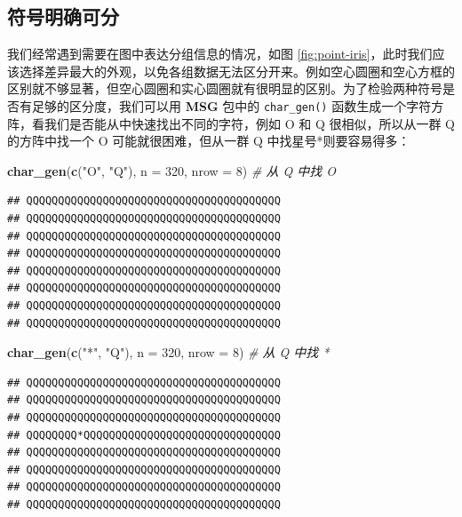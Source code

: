 \documentclass[
  b5paper,
  UTF8,twoside]{book}
\newenvironment{Shaded}{\begin{snugshade}}{\end{snugshade}}
\newcommand{\AttributeTok}[1]{\textcolor[rgb]{0.13,0.29,0.53}{#1}}
\newcommand{\CommentTok}[1]{\textcolor[rgb]{0.56,0.35,0.01}{\textit{#1}}}
\newcommand{\DecValTok}[1]{\textcolor[rgb]{0.00,0.00,0.81}{#1}}
\newcommand{\FunctionTok}[1]{\textcolor[rgb]{0.13,0.29,0.53}{\textbf{#1}}}
\newcommand{\NormalTok}[1]{#1}
\newcommand{\StringTok}[1]{\textcolor[rgb]{0.31,0.60,0.02}{#1}}
\begin{document}
\subsection{符号明确可分}\label{subsec:clear-symbols}

我们经常遇到需要在图中表达分组信息的情况，如图 \ref{fig:point-iris}，此时我们应该选择差异最大的外观，以免各组数据无法区分开来。例如空心圆圈和空心方框的区别就不够显著，但空心圆圈和实心圆圈就有很明显的区别。为了检验两种符号是否有足够的区分度，我们可以用 \textbf{MSG} 包中的 \texttt{char\_gen()} 函数生成一个字符方阵，看我们是否能从中快速找出不同的字符，例如 O 和 Q 很相似，所以从一群 Q 的方阵中找一个 O 可能就很困难，但从一群 Q 中找星号*则要容易得多：

\begin{Shaded}
\begin{Highlighting}[]
\FunctionTok{char\_gen}\NormalTok{(}\FunctionTok{c}\NormalTok{(}\StringTok{"O"}\NormalTok{, }\StringTok{"Q"}\NormalTok{), }\AttributeTok{n =} \DecValTok{320}\NormalTok{, }\AttributeTok{nrow =} \DecValTok{8}\NormalTok{) }\CommentTok{\# 从 Q 中找 O}
\end{Highlighting}
\end{Shaded}

\begin{verbatim}
## QQQQQQQQQQQQQQQQQQQQQQQQQQQQQQQQQQQQQQQQ
## QQQQQQQQQQQQQQQQOQQQQQQQQQQQQQQQQQQQQQQQ
## QQQQQQQQQQQQQQQQQQQQQQQQQQQQQQQQQQQQQQQQ
## QQQQQQQQQQQQQQQQQQQQQQQQQQQQQQQQQQQQQQQQ
## QQQQQQQQQQQQQQQQQQQQQQQQQQQQQQQQQQQQQQQQ
## QQQQQQQQQQQQQQQQQQQQQQQQQQQQQQQQQQQQQQQQ
## QQQQQQQQQQQQQQQQQQQQQQQQQQQQQQQQQQQQQQQQ
## QQQQQQQQQQQQQQQQQQQQQQQQQQQQQQQQQQQQQQQQ
\end{verbatim}

\begin{Shaded}
\begin{Highlighting}[]
\FunctionTok{char\_gen}\NormalTok{(}\FunctionTok{c}\NormalTok{(}\StringTok{"*"}\NormalTok{, }\StringTok{"Q"}\NormalTok{), }\AttributeTok{n =} \DecValTok{320}\NormalTok{, }\AttributeTok{nrow =} \DecValTok{8}\NormalTok{) }\CommentTok{\# 从 Q 中找 *}
\end{Highlighting}
\end{Shaded}

\begin{verbatim}
## QQQQQQQQQQQQQQQQQQQQQQQQQQQQQQQQQQQQQQQQ
## QQQQQQQQQQQQQQQQQQQQQQQQQQQQQQQQQQQQQQQQ
## QQQQQQQQQQQQQQQQQQQQQQQQQQQQQQQQQQQQQQQQ
## QQQQQQQQ*QQQQQQQQQQQQQQQQQQQQQQQQQQQQQQQ
## QQQQQQQQQQQQQQQQQQQQQQQQQQQQQQQQQQQQQQQQ
## QQQQQQQQQQQQQQQQQQQQQQQQQQQQQQQQQQQQQQQQ
## QQQQQQQQQQQQQQQQQQQQQQQQQQQQQQQQQQQQQQQQ
## QQQQQQQQQQQQQQQQQQQQQQQQQQQQQQQQQQQQQQQQ
\end{verbatim}
\end{document}
